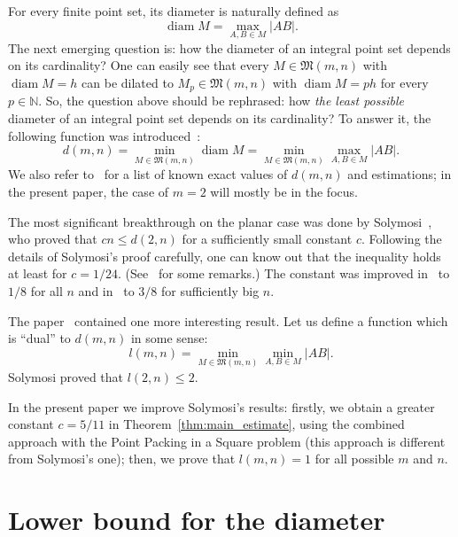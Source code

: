\documentclass[a4paper,14pt]{article} %
\theoremstyle{plain}
\theoremstyle{definition}
\begin{document}
For every finite point set, its diameter is naturally defined as
\begin{equation}
	\operatorname{diam} M = \max_{A,B\in M} |AB|
	.
\end{equation}
The next emerging question is: how the diameter of an integral point set depends on its cardinality?
One can easily see that every $M\in\mathfrak{M}(m,n)$ with $\operatorname{diam} M = h$
can be dilated to $M_p\in\mathfrak{M}(m,n)$ with $\operatorname{diam} M = ph$
for every $p\in\mathbb{N}$.
So, the question above should be rephrased:
how \textit{the least possible} diameter of an integral point set depends on its cardinality?
To answer it, the following function was introduced~\cite{kurz2008bounds,kurz2008minimum}:
\begin{equation}
	d(m,n) = \min_{M\in\mathfrak{M}(m,n)} \operatorname{diam} M = \min_{M\in\mathfrak{M}(m,n)} \max_{A,B\in M} |AB|
	.
\end{equation}
We also refer to~\cite{kurz2008bounds} for a list of known exact values of $d(m,n)$
and estimations; in the present paper, the case of $m=2$ will mostly be in the focus.

The most significant breakthrough on the planar case was done by Solymosi~\cite{solymosi2003note},
who proved that $cn \leq d(2,n)$ for a sufficiently small constant $c$.
Following the details of Solymosi's proof carefully,
one can know out that the inequality holds at least for $c = 1/24$.
(See~\cite[Exercise 2.6]{garibaldi2005erdos} for some remarks.)
The constant was improved in~\cite{our-mz-rus} to $1/8$ for all $n$ and in~\cite{our-vmmsh-2018}
to $3/8$ for sufficiently big $n$.

The paper~\cite{solymosi2003note} contained one more interesting result.
Let us define a function which is ``dual'' to $d(m,n)$ in some sense:
\begin{equation}
	l(m,n) = \min_{M\in\mathfrak{M}(m,n)} \min_{A,B\in M} |AB|
	.
\end{equation}
Solymosi proved that $l(2,n)\leq 2$.

In the present paper we improve Solymosi's results:
firstly, we obtain a greater constant $c = 5/11$ in Theorem~\ref{thm:main_estimate},
using the combined approach with the Point Packing in a Square problem
(this approach is different from Solymosi's one);
then, we prove that $l(m,n)=1$ for all possible $m$ and $n$.

\section{Lower bound for the diameter}
\end{document}
